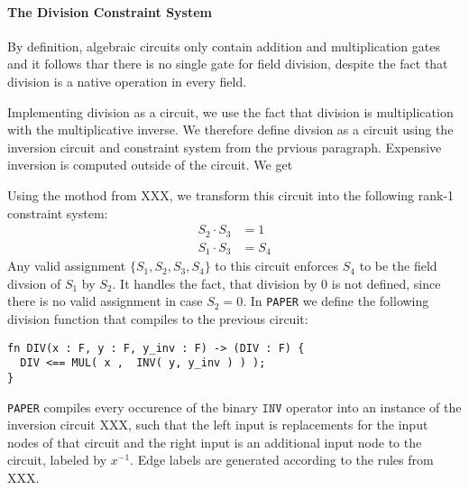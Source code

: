 \paragraph{The Division Constraint System} By definition, algebraic circuits only contain addition and multiplication gates and it follows thar there is no single gate for field division, despite the fact that division is a native operation in every field.

Implementing division as a circuit, we use the fact that division is multiplication with the multiplicative inverse. We therefore define divsion as a circuit using the inversion circuit and constraint system from the prvious paragraph. Expensive inversion is computed outside of the circuit. We get 
\begin{center}
\end{center} 
Using the mothod from XXX, we transform this circuit into the following rank-1 constraint system:
\begin{align*}
S_2 \cdot S_3 &= 1\\
S_1 \cdot S_3 &= S_4
\end{align*}
Any valid assignment $\{S_1,S_2,S_3,S_4\}$ to this circuit enforces $S_4$ to be the field divsion of $S_1$ by $S_2$. It handles the fact, that division by $0$ is not defined, since there is no valid assignment in case $S_2=0$. In \texttt{PAPER} we define the following division function that compiles to the previous circuit:
\begin{lstlisting}
fn DIV(x : F, y : F, y_inv : F) -> (DIV : F) {
  DIV <== MUL( x ,  INV( y, y_inv ) ) );
}
\end{lstlisting}
\texttt{PAPER} compiles every occurence of the binary $\mathtt{INV}$ operator into an instance of the inversion circuit XXX, such that the left input is replacements for the input nodes of that circuit and the right input is an additional input node to the circuit, labeled by $x^{-1}$. Edge labels are generated according to the rules from XXX.


